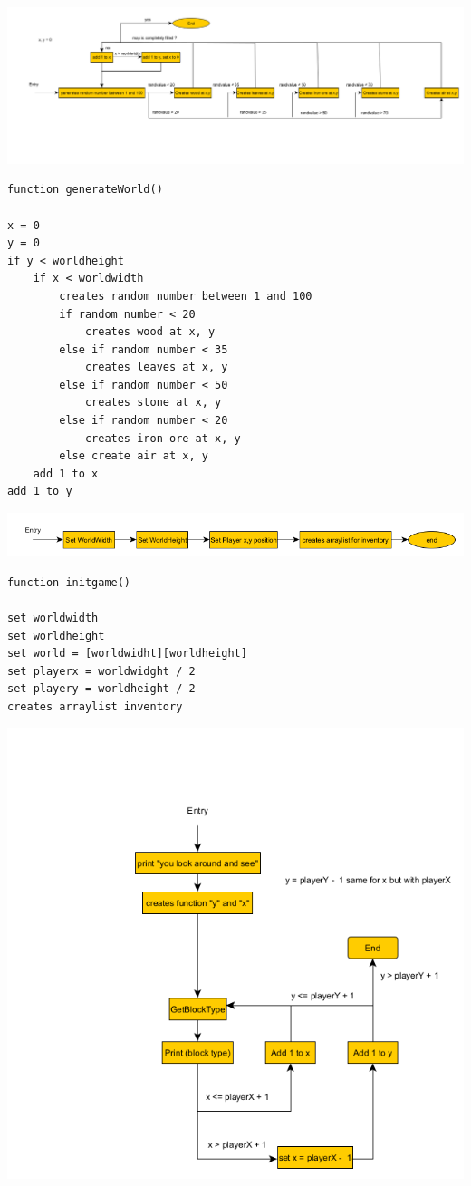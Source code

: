 \newpage
{\includegraphics[width=\textwidth]{../flowchart/generateWorld.png}}
\begin{lstlisting}
function generateWorld()

x = 0
y = 0
if y < worldheight  
    if x < worldwidth 
        creates random number between 1 and 100
        if random number < 20
            creates wood at x, y
        else if random number < 35
            creates leaves at x, y
        else if random number < 50
            creates stone at x, y
        else if random number < 20
            creates iron ore at x, y
        else create air at x, y
    add 1 to x
add 1 to y

\end{lstlisting}
\newpage
{\includegraphics[width=\textwidth]{../flowchart/initGame.png}}
\begin{lstlisting}
function initgame()

set worldwidth
set worldheight
set world = [worldwidht][worldheight]
set playerx = worldwidght / 2
set playery = worldheight / 2
creates arraylist inventory

\end{lstlisting}
\newpage
{\includegraphics[width=\textwidth]{../flowchart/lookAround.png}}
